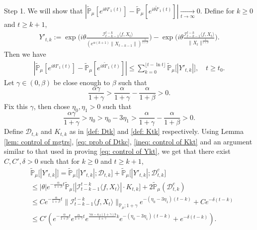 \documentclass[12pt,a4paper]{amsart}
\theoremstyle{plain}
\theoremstyle{definition}
\numberwithin{equation}{section}
\begin{document}
    Step 1. We will show that $|\mathbb{\tilde{P}}_{\mu}[e^{i\theta I'_1(t)}]-\mathbb{\tilde{P}}_{\mu}[e^{i\theta\tilde I'_1(t)}]|\xrightarrow[t\to \infty]{} 0$.
    Define for $k\geq 0$ and $t\geq k+1$,
\begin{align*}
    Y'_{t,k}
    :=\exp\Big(i\theta\frac{\mathcal I_{t-k-1}^{t-k}\langle f ,X_t\rangle}{( e^{\alpha(k+1)}\|X_{t-k-1}\|)^{\frac{1}{1+\beta}}}\Big)-\exp\Big(i\theta\frac{\mathcal I_{t-k-1}^{t-k}\langle f ,X_t\rangle}{\|X_t\|^{\frac{1}{1+\beta}}}\Big).
\end{align*}
	Then we have
\begin{equation}\begin{split}
\label{ineq: control of I1tb}
    |\mathbb{\tilde{P}}_{\mu}[e^{i\theta I'_1(t)}] - \mathbb{\tilde{P}}_{\mu} [e^{i\theta\tilde{I}'_1(t)}]|
    \leq \sum_{k=0}^{\lfloor t-\ln t \rfloor}\mathbb{\tilde{P}}_{\mu}\big[|Y'_{t,k}|\big],
    \quad t\geq t_0.
\end{split}\end{equation}
    Let $\gamma \in (0,\beta)$ be close enough to $\beta$ such that
\[
    \frac{\alpha \gamma}{1+\gamma} > \frac{\alpha}{1+\gamma} - \frac{\alpha}{1+\beta} > 0.
\]
    Fix this $\gamma$, then chose $\eta_0,\eta_1>0$ such that
\[
    \frac{\alpha \gamma}{1+\gamma} >\eta_0 > \eta_0 - 3\eta_1 > \frac{\alpha}{1+\gamma} - \frac{\alpha}{1+\beta} > 0.
\]
	Define $\mathcal D_{t,k}$ and $K_{t,k}$ as in \eqref{def: Dtk} and \eqref{def: Ktk} respectively.
	Using Lemma \ref{lem: control of mgtrs}, \eqref{eq: prob of Dtkc}, \eqref{ineq: control of Kkt} and an argument similar to that used in proving \eqref{eq: control of Ykt}, we get that there exist $C,C',\delta>0$ such that for $k\geq 0$ and $t\geq k+1$,
\begin{align*}
    &\mathbb{\tilde{P}}_{\mu}\big[|Y'_{t,k}|\big]
    = \mathbb{\tilde{P}}_{\mu}\big[|Y'_{t,k}|; \mathcal D_{t,k}\big] + \mathbb{\tilde{P}}_{\mu}\big[|Y'_{t,k}|; \mathcal D_{t,k}^c \big]
    \\& \leq |\theta| e^{-\frac{\alpha}{1+\beta} t}\mathbb{\tilde{P}}_{\mu}\big[|\mathcal I_{t-k-1}^{t-k}\langle f ,X_t\rangle|\cdot K_{t,k}\big] + 2\mathbb{\tilde{P}}_{\mu}( \mathcal D_{t,k}^c )
    \\& \leq C e^{-\frac{\alpha}{1+\beta} t} \|\mathcal I_{t-k-1}^{t-k}\langle f, X_t\rangle \|_{\mathbb P_\mu; 1+\gamma}e^{-(\eta_0 - 3\eta_1)(t-k)} + Ce^{-\delta(t-k)}
    \\& \leq C'( e^{-\frac{\alpha}{1+\beta}t}e^{\frac{\alpha}{1+\gamma}t}e^{\frac{\gamma \alpha-\kappa_f(1+\gamma)b}{1+\gamma}k}e^{-(\eta_0 - 3\eta_1)(t-k)}+ e^{-\delta(t-k)}).
\end{align*}
\end{document}
